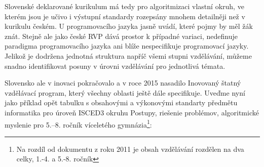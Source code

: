 \documentclass[FP,DP]{tulthesis}
\begin{document}
{{{\begin{table}[t]
\begin{tabular}{|l|l|}
\\\hline
\end{tabular}
\end{table}
 Slovenské deklarované kurikulum má tedy pro algoritmizaci vlastní okruh, ve kterém jsou je učivo i výstupní standardy rozepsány mnohem detailněji než v kurikulu českém. U programovacího jazyka jasně uvádí, které pojmy by měl žák znát. Stejně ale jako české RVP dává prostor k případné variaci, nedefinuje paradigma programovacího jazyka ani blíže nespecifikuje programovací jazyky. Jelikož je dodržena jednotná struktura napříč všemi stupni vzdělávání, můžeme snadno identifikovat posuny  v úrovni vzdělávání pro jednotlivá témata. \citep[s.~85]{berki2016}

Slovensko ale v inovaci pokračovalo a v roce 2015 nasadilo Inovovaný štatný vzdělávací program, který všechny oblasti ještě dále specifikuje.   Uveďme nyní jako příklad opět  tabulku s obsahovými a výkonovými standarty předmětu informatika pro úroveň ISCED3 okruhu  Postupy, riešenie problémov, algoritmické myslenie pro 5.--8. ročník víceletého gymnázia\footnote{Na rozdíl od dokumentu z roku 2011 je obsah vzdělávání rozdělen na dva celky, 1.-4. a 5.-8. ročník}:







}}}
\end{document}
